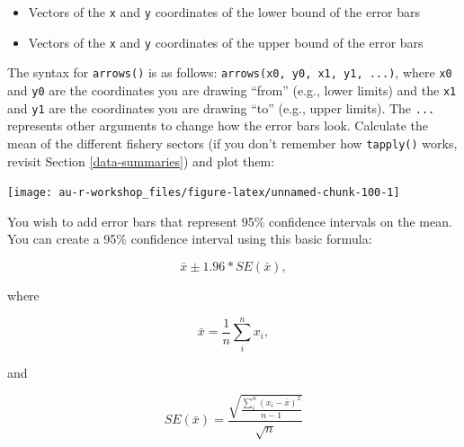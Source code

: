 \documentclass[]{book}
\newenvironment{Shaded}{\begin{snugshade}}{\end{snugshade}}
\newcommand{\KeywordTok}[1]{\textcolor[rgb]{0.13,0.29,0.53}{\textbf{#1}}}
\newcommand{\StringTok}[1]{\textcolor[rgb]{0.31,0.60,0.02}{#1}}
\newcommand{\OperatorTok}[1]{\textcolor[rgb]{0.81,0.36,0.00}{\textbf{#1}}}
\newcommand{\NormalTok}[1]{#1}
\providecommand{\tightlist}{%
  \setlength{\itemsep}{0pt}\setlength{\parskip}{0pt}}
\theoremstyle{definition}
\theoremstyle{definition}
\theoremstyle{definition}
\theoremstyle{remark}
\begin{document}
\begin{itemize}
\tightlist
\item
  Vectors of the \texttt{x} and \texttt{y} coordinates of the lower
  bound of the error bars
\item
  Vectors of the \texttt{x} and \texttt{y} coordinates of the upper
  bound of the error bars
\end{itemize}

The syntax for \texttt{arrows()} is as follows:
\texttt{arrows(x0,\ y0,\ x1,\ y1,\ ...)}, where \texttt{x0} and
\texttt{y0} are the coordinates you are drawing ``from'' (e.g., lower
limits) and the \texttt{x1} and \texttt{y1} are the coordinates you are
drawing ``to'' (e.g., upper limits). The \texttt{...} represents other
arguments to change how the error bars look. Calculate the mean of the
different fishery sectors (if you don't remember how \texttt{tapply()}
works, revisit Section \ref{data-summaries}) and plot them:

\begin{Shaded}
\end{Shaded}

\begin{center}\texttt{[image: au-r-workshop\_files/figure-latex/unnamed-chunk-100-1]} \end{center}

You wish to add error bars that represent 95\% confidence intervals on
the mean. You can create a 95\% confidence interval using this basic
formula:

\begin{equation}
  \bar{x} \pm 1.96 * SE(\bar{x}),
\label{eq:ci}
\end{equation}

where

\begin{equation}
  \bar{x}=\frac{1}{n}\sum_i^n{x_i},
\label{eq:ci-mean}
\end{equation}

and

\begin{equation}
  SE(\bar{x})=\frac{\sqrt{\frac{\sum_i^n{(x_i - \bar{x})^2}}{n-1}}}{\sqrt{n}}
\label{eq:ci-se}
\end{equation}
\end{document}
